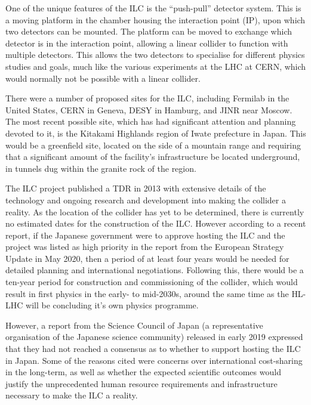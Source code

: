 One of the unique features of the \acrshort{ILC} is the ``push-pull'' detector system. This is a moving platform in the chamber housing the interaction point (\acrshort{IP}), upon which two detectors can be mounted. The platform can be moved to exchange which detector is in the interaction point, allowing a linear collider to function with multiple detectors. This allows the two detectors to specialise for different physics studies and goals, much like the various experiments at the \acrshort{LHC} at \acrshort{CERN}, which would normally not be possible with a linear collider.

There were a number of proposed sites for the \acrshort{ILC}, including Fermilab in the United States, \acrshort{CERN} in Geneva, \acrshort{DESY} in Hamburg, and \acrshort{JINR} near Moscow. The most recent possible site, which has had significant attention and planning devoted to it, is the Kitakami Highlands region of Iwate prefecture in Japan. This would be a greenfield site, located on the side of a mountain range and requiring that a significant amount of the facility's infrastructure be located underground, in tunnels dug within the granite rock of the region. 

The \acrshort{ILC} project published a \acrfull{TDR} in 2013 with extensive details of the technology and ongoing research and development into making the collider a reality. As the location of the collider has yet to be determined, there is currently no estimated dates for the construction of the \acrshort{ILC}. However according to a recent report\cite{ilc-timeline-2019}, if the Japanese government were to approve hosting the \acrshort{ILC} and the project was listed as high priority in the report from the European Strategy Update in May 2020, then a period of at least four years would be needed for detailed planning and international negotiations. Following this, there would be a ten-year period for construction and commissioning of the collider, which would result in first physics in the early- to mid-2030s, around the same time as the \acrshort{HL-LHC} will be concluding it's own physics programme.

However, a report from the Science Council of Japan (a representative organisation of the Japanese science community) released in early 2019 expressed that they had not reached a consensus as to whether to support hosting the \acrshort{ILC} in Japan. Some  of the reasons cited were concerns over international cost-sharing in the long-term, as well as whether the expected scientific outcomes would justify the unprecedented human resource requirements and infrastructure necessary to make the \acrshort{ILC} a reality\cite{linearcolliders-scj-report}.

